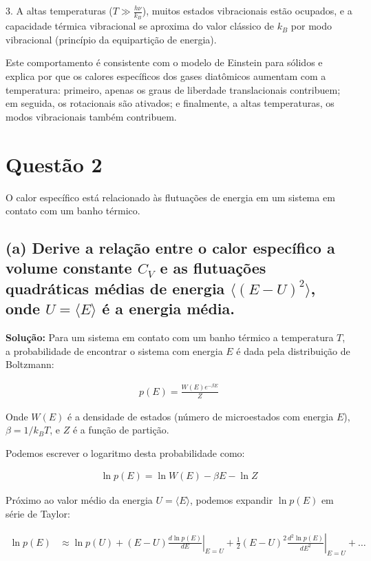 \documentclass[fleqn,a4paper]{article}
\begin{document}
3. A altas temperaturas ($T \gg \frac{h\nu}{k_B}$), muitos estados vibracionais estão ocupados, e a capacidade térmica vibracional se aproxima do valor clássico de $k_B$ por modo vibracional (princípio da equipartição de energia).

Este comportamento é consistente com o modelo de Einstein para sólidos e explica por que os calores específicos dos gases diatômicos aumentam com a temperatura: primeiro, apenas os graus de liberdade translacionais contribuem; em seguida, os rotacionais são ativados; e finalmente, a altas temperaturas, os modos vibracionais também contribuem.

\section*{Questão 2}
O calor específico está relacionado às flutuações de energia em um sistema em contato com um banho térmico.

\subsection*{(a) Derive a relação entre o calor específico a volume constante $C_V$ e as flutuações quadráticas médias de energia $\langle(E-U)^2\rangle$, onde $U = \langle E \rangle$ é a energia média.}

\textbf{Solução:}
Para um sistema em contato com um banho térmico a temperatura $T$, a probabilidade de encontrar o sistema com energia $E$ é dada pela distribuição de Boltzmann:

\begin{align}
p(E) = \frac{W(E)e^{-\beta E}}{Z}
\end{align}

Onde $W(E)$ é a densidade de estados (número de microestados com energia $E$), $\beta = 1/k_B T$, e $Z$ é a função de partição.

Podemos escrever o logaritmo desta probabilidade como:

\begin{align}
\ln p(E) = \ln W(E) - \beta E - \ln Z
\end{align}

Próximo ao valor médio da energia $U = \langle E \rangle$, podemos expandir $\ln p(E)$ em série de Taylor:

\begin{align}
\ln p(E) &\approx \ln p(U) + (E-U)\left.\frac{d\ln p(E)}{dE}\right|_{E=U} + \frac{1}{2}(E-U)^2\left.\frac{d^2\ln p(E)}{dE^2}\right|_{E=U} + \ldots
\end{align}
\end{document}
